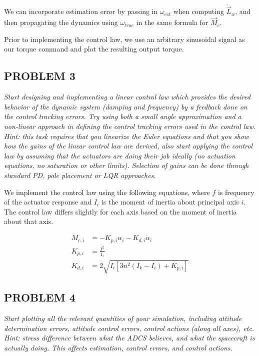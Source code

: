 We can incorporate estimation error by passing in $\omega_{est}$ when computing $\Dot{\Vec{L}}_{w}$, and then propagating the dynamics using $\omega_{true}$ in the same formula for $\Vec{M}_{c}$.

Prior to implementing the control law, we use an arbitrary sinusoidal signal as our torque command and plot the resulting output torque.

\subsection{PROBLEM 3}
\textit{Start designing and implementing a linear control law which provides the desired behavior of the dynamic system (damping and frequency) by a feedback done on the control tracking errors. Try using both a small angle approximation and a non-linear approach in defining the control tracking errors used in the control law. Hint: this task requires that you linearize the Euler equations and that you show how the gains of the linear control law are derived, also start applying the control law by assuming that the actuators are doing their job ideally (no actuation equations, no saturation or other limits). Selection of gains can be done through standard PD, pole placement or LQR approaches.}

We implement the control law using the following equations, where $f$ is frequency of the actuator response and $I_{i}$ is the moment of inertia about principal axis $i$. The control law differs slightly for each axis based on the moment of inertia about that axis.

\begin{align*}
    M_{c,i} &= -K_{p,i} \alpha_{i} - K_{d,i} \Dot{\alpha}_{i} \\
    K_{p,i} &= \frac{f^{2}}{I_{i}} \\
    K_{d,i} &= 2 \sqrt{I_{i} \left[ 3 n^{2} (I_{k} - I_{i}) + K_{p,i} \right]}
\end{align*}

\subsection{PROBLEM 4}
\textit{Start plotting all the relevant quantities of your simulation, including attitude determination errors, attitude control errors, control actions (along all axes), etc. Hint: stress difference between what the ADCS believes, and what the spacecraft is actually doing. This affects estimation, control errors, and control actions.}

